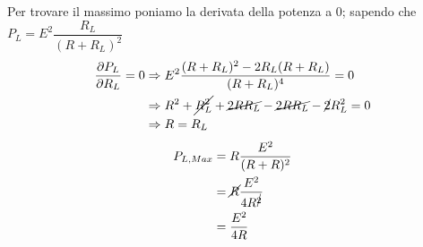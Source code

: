 \documentclass{article}
\begin{document}
Per trovare il massimo poniamo la derivata della potenza a 0; sapendo che $P_L = E^2 \dfrac{R_L}{(R+R_L)^2}$
\begin{align*}
    \dfrac{\partial P_L}{\partial R_L}=0 &\Rightarrow E^2 \dfrac{(R+R_L)^2 - 2R_L(R+R_L)}{(R+R_L)^4}=0\\
    & \Rightarrow R^2 + \cancel{R^2_L} + \cancel{2RR_L} - \cancel{2RR_L} -\cancel{2}R^2_L = 0\\
    &\Rightarrow R=R_L
\end{align*} 
\begin{align*}
    P_{L,Max} &= R \dfrac{E^2}{(R+R)^2}\\
    &= \cancel{R} \dfrac{E^2}{4R^{\cancel{2}}}\\
    &= \dfrac{E^2}{4R}
\end{align*}
\end{document}
